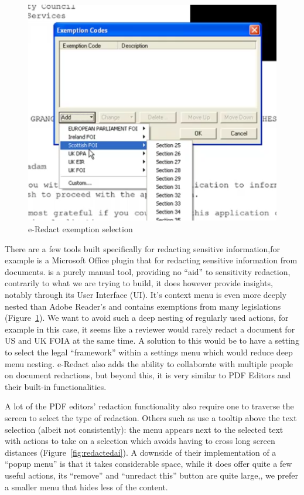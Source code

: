\documentclass[\version]{l4proj}
\begin{document}
\begin{figure}
    \includegraphics[width=\linewidth]{images/related_products/eredact_dropdown.png}
    \caption{e-Redact exemption selection}\label{fig:eredact-dropdown}
    \vspace{-15pt}
\end{figure}

There are a few tools built specifically for redacting sensitive information,for example \textcite{ERedact} is a Microsoft Office plugin that for redacting sensitive information from documents.
\textcite{ERedact} is a purely manual tool, providing no ``aid'' to sensitivity redaction, contrarily to what we are trying to build, it does however provide insights, notably through its User Interface (UI).
It's context menu is even more deeply nested than Adobe Reader's and contains exemptions from many legislations (Figure~\ref{fig:eredact-dropdown}).
We want to avoid such a deep nesting of regularly used actions, for example in this case, it seems like a reviewer would rarely redact a document for US and UK FOIA at the same time.
A solution to this would be to have a setting to select the legal ``framework'' within a settings menu which would reduce deep menu nesting.
e-Redact also adds the ability to collaborate with multiple people on document redactions, but beyond this, it is very similar to PDF Editors and their built-in functionalities.

A lot of the PDF editors' redaction functionality also require one to traverse the screen to select the type of redaction.
Others such as \textcite{RedactedAIRemovea} use a tooltip above the text selection (albeit not consistently): the menu appears next to the selected text with actions to take on a selection which avoids having to cross long screen distances (Figure~\ref{fig:redactedai}).
A downside of their implementation of a ``popup menu'' is that it takes considerable space, while it does offer quite a few useful actions, its ``remove'' and ``unredact this'' button are quite large,, we prefer a smaller menu that hides less of the content.
\end{document}
